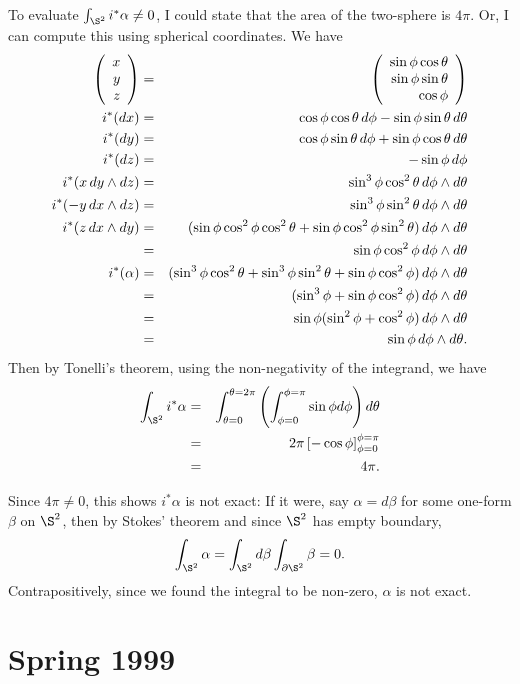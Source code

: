 \documentclass[10pt]{article}
\numberwithin{equation}{subsection}
\begin{document}
To evaluate $\int_{\S^2} i^*\alpha \ne 0$, I could state that the area of the
two-sphere is $4\pi$.  Or, I can compute this using spherical coordinates.  We
have
\begin{eqnarray*}
	\left(\begin{array}{r} x \\ y \\ z\end{array}\right) &=& \left(\begin{array}{r} \sin\phi\cos\theta \\ \sin\phi\sin\theta \\ \cos\phi\end{array}\right) \\
	i^*(dx) &=& \cos\phi\cos\theta\,d\phi - \sin\phi\sin\theta\,d\theta \\
	i^*(dy) &=& \cos\phi\sin\theta\,d\phi + \sin\phi\cos\theta\,d\theta \\
	i^*(dz) &=& -\sin\phi \,d\phi \\
	i^*(x\, dy \wedge dz) &=& \sin^3\phi\cos^2\theta \,d\phi\wedge d\theta\\
	i^*(-y\,dx \wedge dz) &=& \sin^3\phi\sin^2\theta\,d\phi\wedge d\theta \\
	i^*(z\, dx \wedge dy) &=&
		(\sin\phi\cos^2\phi\cos^2\theta + \sin\phi\cos^2\phi\sin^2\theta)
		\,d\phi\wedge d\theta \\
	&=& \sin\phi\cos^2\phi \,d\phi\wedge d\theta \\
	i^*(\alpha) &=&
		(\sin^3\phi\cos^2\theta +
		\sin^3\phi \sin^2\theta +
		\sin\phi\cos^2\phi) \,d\phi\wedge d\theta \\
	&=& (\sin^3\phi +\sin\phi\cos^2\phi) \,d\phi\wedge d\theta \\
	&=& \sin\phi(\sin^2\phi + \cos^2\phi) \,d\phi\wedge d\theta \\
	&=& \sin\phi \,d\phi\wedge d\theta.
\end{eqnarray*}
Then by Tonelli's theorem, using the non-negativity of the integrand, we have
\begin{eqnarray*}
	\int_{\S^2} i^*\alpha &=&
		\int_{\theta=0}^{\theta=2\pi} \left(\int_{\phi=0}^{\phi=\pi} \sin\phi d\phi \right) d\theta \\
	&=& 2\pi \left[ -\cos\phi\right]_{\phi=0}^{\phi=\pi} \\
	&=& 4\pi.
\end{eqnarray*}

Since $4\pi \ne 0$, this shows $i^*\alpha$ is not exact:  If it were, say
$\alpha=d\beta$ for some one-form $\beta$ on $\S^2$, then by Stokes' theorem
and since $\S^2$ has empty boundary,
$$
	\int_{\S^2} \alpha = \int_{\S^2} d\beta \int_{\D \S^2} \beta = 0.
$$
Contrapositively, since we found the integral to be non-zero, $\alpha$ is not exact.

\newpage
\section{Spring 1999}
\end{document}
